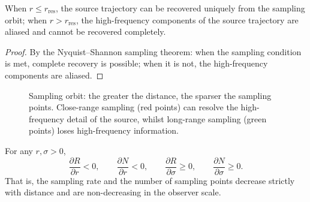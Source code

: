 \begin{corollary}\label{cor:dyn_sampling_recoverability}
When $r\le r_{\text{res}}$, the source trajectory can be recovered uniquely from the sampling orbit; when $r>r_{\text{res}}$, the high-frequency components of the source trajectory are aliased and cannot be recovered completely.
\end{corollary}

\begin{proof}
By the Nyquist--Shannon sampling theorem: when the sampling condition is met, complete recovery is possible; when it is not, the high-frequency components are aliased.
\end{proof}

\begin{figure}[htbp]
\centering
{}
\caption{Sampling orbit: the greater the distance, the sparser the sampling points. Close-range sampling (red points) can resolve the high-frequency detail of the source, whilst long-range sampling (green points) loses high-frequency information.}
\label{fig:dyn_sampling_orbit}
\end{figure}

\begin{proposition}\label{prop:dyn_sampling_monotonicity}
For any $r,\sigma>0$,
\[
\frac{\partial R}{\partial r}<0,\qquad
\frac{\partial N}{\partial r}<0,\qquad
\frac{\partial R}{\partial\sigma}\ge 0,\qquad
\frac{\partial N}{\partial\sigma}\ge 0.
\]
That is, the sampling rate and the number of sampling points decrease strictly with distance and are non-decreasing in the observer scale.
\end{proposition}

